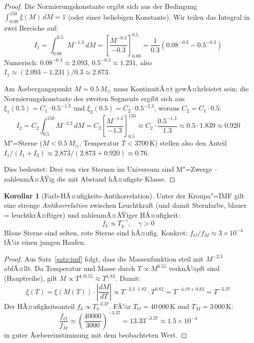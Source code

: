 ﻿\documentclass[a4paper,12pt]{article}
\theoremstyle{definition}
\newtheorem{korollar}{Korollar}
\begin{document}
\begin{proof}
    Die Normierungskonstante ergibt sich aus der Bedingung
    $\int_{0.08}^{150} \xi(M)\,dM = 1$ (oder einer beliebigen Konstante).
    Wir teilen das Integral in zwei Bereiche auf:
    \[
        I_1 = \int_{0.08}^{0.5} M^{-1.3}\,dM
        = \left[\frac{M^{-0.3}}{-0.3}\right]_{0.08}^{0.5}
        = \frac{1}{0.3}\left(0.08^{-0.3} - 0.5^{-0.3}\right)
    \]
    Numerisch: $0.08^{-0.3} \approx 2.093$, $0.5^{-0.3} \approx 1.231$,
    also $I_1 \approx (2.093 - 1.231)/0.3 \approx 2.873$.

    Am Ãœbergangspunkt $M = 0.5\,M_\odot$ muss KontinuitÃ¤t gewÃ¤hrleistet sein;
    die Normierungskonstante des zweiten Segments ergibt sich aus
    $\xi_1(0.5) = C_1 \cdot 0.5^{-1.3}$ und
    $\xi_2(0.5) = C_2 \cdot 0.5^{-2.3}$, woraus $C_2 = C_1 \cdot 0.5$:
    \[
        I_2 = C_2\int_{0.5}^{150} M^{-2.3}\,dM
        = C_2 \left[\frac{M^{-1.3}}{-1.3}\right]_{0.5}^{150}
        \approx C_2 \cdot \frac{0.5^{-1.3}}{1.3} \approx 0.5 \cdot 1.839
        \approx 0.920
    \]
    M"=Sterne ($M < 0.5\,M_\odot$, Temperatur $T < 3700\,\text{K}$) stellen
    also den Anteil $I_1 / (I_1 + I_2) \approx 2.873 / (2.873+0.920) \approx 0.76$.

    Dies bedeutet: Drei von vier Sternen im Universum sind M"=Zwerge --
    zahlenmÃ¤ÃŸig die mit Abstand hÃ¤ufigste Klasse. \qedhere
\end{proof}

\begin{korollar}[Farb-HÃ¤ufigkeits-Antikorrelation]
\label{kor:antikorr}
    Unter der Kroupa"=IMF gilt eine strenge \emph{Antikorrelation} zwischen
    Leuchtkraft (und damit Sternfarbe, blauer = leuchtkrÃ¤ftiger) und
    zahlenmÃ¤ÃŸiger HÃ¤ufigkeit:
    \[
        f_k \propto T_k^{-\gamma}, \quad \gamma > 0
    \]
    Blaue Sterne sind selten, rote Sterne sind hÃ¤ufig. Konkret:
    $f_O / f_M \approx 3 \times 10^{-4}$ fÃ¼r einen jungen Haufen.
\end{korollar}

\begin{proof}
    Aus Satz~\ref{satz:imf} folgt, dass die Massenfunktion steil mit
    $M^{-2.3}$ abfÃ¤llt. Da Temperatur und Masse durch $T \propto M^{0.55}$
    verknÃ¼pft sind (Hauptreihe), gilt $M \propto T^{1/0.55} \approx T^{1.82}$.
    Damit:
    \[
        \xi(T) = \xi(M(T)) \cdot \left|\frac{dM}{dT}\right|
        \propto T^{-2.3 \cdot 1.82} \cdot T^{0.82}
        = T^{-4.19 + 0.82} = T^{-3.37}
    \]
    Der HÃ¤ufigkeitsanteil $f_k \propto T_k^{-3.37}$. FÃ¼r
    $T_O = 40\,000\,\text{K}$ und $T_M = 3\,000\,\text{K}$:
    \[
        \frac{f_O}{f_M} \approx \left(\frac{40000}{3000}\right)^{-3.37}
        = 13.33^{-3.37} \approx 1.5 \times 10^{-4}
    \]
    in guter Ãœbereinstimmung mit dem beobachteten Wert. \qedhere
\end{proof}
\end{document}
